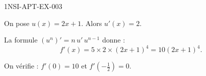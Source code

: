 \begin{corrige}{1NSI-APT-EX-003}

On pose $u(x) = 2x+1$. Alors $u'(x) = 2$.


La formule $(u^n)' = n\,u'\,u^{n-1}$ donne :
\[ f'(x) = 5 \times 2 \times (2x+1)^4 = 10(2x+1)^4. \]

On vérifie : $f'(0) = 10$ et $f'\!\left(-\tfrac{1}{2}\right) = 0$.

\end{corrige}
